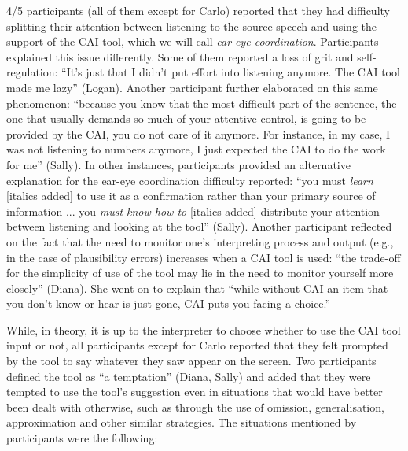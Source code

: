 
4/5 participants (all of them except for Carlo) reported that they had difficulty splitting their attention between listening to the source speech and using the support of the CAI tool, which we will call \textit{ear-eye coordination}. Participants explained this issue differently. Some of them reported a loss of grit and self-regulation: ``It’s just that I didn’t put effort into listening anymore. The CAI tool made me lazy'' (Logan). Another participant further elaborated on this same phenomenon: ``because you know that the most difficult part of the sentence, the one that usually demands so much of your attentive control, is going to be provided by the CAI, you do not care of it anymore. For instance, in my case, I was not listening to numbers anymore, I just expected the CAI to do the work for me'' (Sally). In other instances, participants provided an alternative explanation for the ear-eye coordination difficulty reported: ``you must \textit{learn} [italics added] to use it as a confirmation rather than your primary source of information ... you \textit{must know how to }[italics added] distribute your attention between listening and looking at the tool'' (Sally). Another participant reflected on the fact that the need to monitor one’s interpreting process and output (e.g., in the case of plausibility errors) increases when a CAI tool is used: ``the trade-off for the simplicity of use of the tool may lie in the need to monitor yourself more closely'' (Diana). She went on to explain that ``while without CAI an item that you don’t know or hear is just gone, CAI puts you facing a choice.''



While, in theory, it is up to the interpreter to choose whether to use the CAI tool input or not, all participants except for Carlo reported that they felt prompted by the tool to say whatever they saw appear on the screen. Two participants defined the tool as ``a temptation'' (Diana, Sally) and added that they were tempted to use the tool’s suggestion even in situations that would have better been dealt with otherwise, such as through the use of omission, generalisation, approximation and other similar strategies. The situations mentioned by participants were the following:

